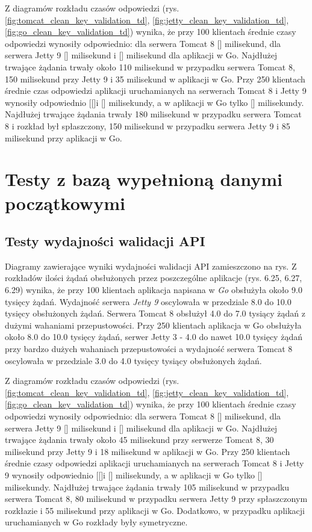 Z diagramów rozkładu czasów odpowiedzi (rys. \ref{fig:tomcat_clean_key_validation_td}, \ref{fig:jetty_clean_key_validation_td}, \ref{fig:go_clean_key_validation_td}) wynika, że przy 100 klientach średnie czasy odpowiedzi wynosiły odpowiednio: dla serwera Tomcat 8 [] milisekund, dla serwera Jetty 9 [] milisekund i [] milisekund dla aplikacji w Go.  Najdłużej trwające żądania trwały około 110 milisekund w przypadku serwera Tomcat 8, 150 milisekund przy Jetty 9 i 35 milisekund  w aplikacji w Go. Przy 250 klientach średnie czas odpowiedzi aplikacji uruchamianych na serwerach Tomcat 8 i Jetty 9  wynosiły  odpowiednio [[]i [] milisekundy, a w aplikacji w Go tylko [] milisekundy. Najdłużej trwające żądania trwały 180 milisekund w przypadku serwera Tomcat 8 i rozkład był spłaszczony, 150 milisekund w przypadku serwera Jetty 9 i 85 milisekund przy aplikacji w Go. 




\clearpage

\newpage
\section{Testy z bazą wypełnioną danymi początkowymi}
\subsection{Testy wydajności walidacji API}
Diagramy zawierające wyniki wydajności walidacji API zamieszczono na rys.
Z rozkładów ilości żądań obsłużonych przez poszczególne aplikacje (rys. 6.25, 6.27, 6.29) wynika, że przy 100 klientach aplikacja napisana w \textsl{Go} obsłużyła około 9.0 tysięcy żądań. Wydajność serwera  \textsl{Jetty 9} oscylowała w przedziale 8.0 do 10.0 tysięcy obsłużonych żądań. Serwera Tomcat 8  obsłużył  4.0 do 7.0 tysiący żądań z dużymi wahaniami przepustowości. Przy 250 klientach aplikacja w Go obsłużyła około 8.0 do 10.0 tysięcy żądań, serwer Jetty 3 - 4.0 do nawet 10.0 tysięcy żądań przy bardzo dużych wahaniach przepustowości a wydajność serwera Tomcat 8 oscylowała w przedziale 3.0 do 4.0 tysięcy tysiący obsłużonych żądań. 
 
Z diagramów rozkładu czasów odpowiedzi (rys. \ref{fig:tomcat_clean_key_validation_td}, \ref{fig:jetty_clean_key_validation_td}, \ref{fig:go_clean_key_validation_td}) wynika, że przy 100 klientach średnie czasy odpowiedzi wynosiły odpowiednio: dla serwera Tomcat 8 [] milisekund, dla serwera Jetty 9 [] milisekund i [] milisekund dla aplikacji w Go.  Najdłużej trwające żądania trwały około 45 milisekund przy serwerze Tomcat 8, 30 milisekund przy Jetty 9 i 18 milisekund  w aplikacji w Go. Przy 250 klientach średnie czasy odpowiedzi aplikacji uruchamianych na serwerach Tomcat 8 i Jetty 9  wynosiły odpowiednio [[]i [] milisekundy, a w aplikacji w Go tylko [] milisekundy. Najdłużej trwające żądania trwały 105 milisekund w przypadku serwera Tomcat 8, 80 milisekund w przypadku serwera Jetty 9 przy spłaszczonym rozkłazie i 55 milisekund przy aplikacji w Go. Dodatkowo, w przypadku aplikacji uruchamianych w Go rozkłady były symetryczne.

\clearpage


